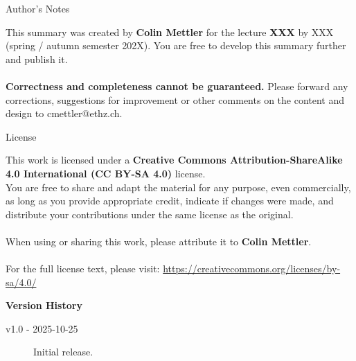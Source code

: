 \begingroup
\raggedright

\begin{topicbox}{\large Author's Notes}
    \raggedright 
    This summary was created by \textbf{Colin Mettler} for the lecture \textbf{XXX} by XXX (spring / autumn semester 202X).
    You are free to develop this summary further and publish it.
    \\~\\
    \textbf{\normalsize Correctness and completeness cannot be guaranteed.} Please forward any corrections, suggestions for improvement or other comments on the content and design to cmettler@ethz.ch.
\end{topicbox}

\vskip 2mm

\begin{topicbox}{\Large License}
    \raggedright
    This work is licensed under a \textbf{Creative Commons Attribution-ShareAlike 4.0 International (CC BY-SA 4.0)} license. 
    \\ You are free to share and adapt the material for any purpose, even commercially, as long as you provide appropriate credit, indicate if changes were made, and distribute your contributions under the same license as the original.
    \\~\\
    \normalsize When using or sharing this work, please attribute it to \textbf{Colin Mettler}.
    \\~\\
    \small{For the full license text, please visit: \url{https://creativecommons.org/licenses/by-sa/4.0/}}
\end{topicbox}


\columnbreak

\begin{formulabox}
    \raggedright \large \textbf{Version History} \normalsize
    \begin{description}
        
        \item[\small v1.0 - 2025-10-25] Initial release.
    \end{description}
\end{formulabox}



\endgroup